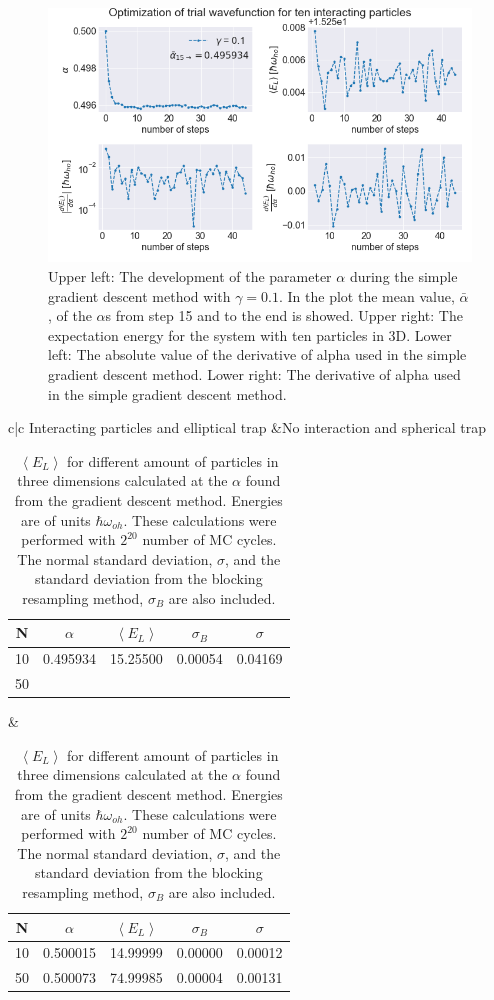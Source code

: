 \begin{figure}[H]
\center
\includegraphics[width=\linewidth]{../Results/gradient_descent_interaction_10p}\caption{Upper left: The development of the parameter $\alpha$ during the simple gradient descent method with $\gamma = 0.1$. In the plot the mean value, $\bar{\alpha}$, of the $\alpha$s from step 15 and to the end is showed. Upper right: The expectation energy for the system with ten particles in 3D. Lower left: The absolute value of the derivative of alpha used in the simple gradient descent method. Lower right: The derivative of alpha used in the simple gradient descent method. }\label{fig:interaction_gradient_descent_N_10}
\end{figure}


\begin{table}[H]\caption{$\left<E_L\right>$ for different amount of particles in three dimensions calculated at the $\alpha$ found from the gradient descent method. Energies are of units $\hbar\omega_{oh}$. These calculations were performed with $2^{20}$ number of MC cycles. The normal standard deviation, $\sigma$, and the standard deviation from the blocking resampling method, $\sigma_B$ are also included.}\label{tab:interaction_vs_not}
\center
\begin{tabular}{c|c}
Interacting particles and elliptical trap &No interaction and spherical trap\\
\begin{tabular}{ccccc}
N &$\alpha$ & $\left< E_L \right>$ & $\sigma_B$ & $\sigma$\\ \hline
10 &0.495934 & 15.25500 & 0.00054 & 0.04169\\
50 & \\
\end{tabular}&
\begin{tabular}{ccccc}
N &$\alpha$ & $\left< E_L \right>$ & $\sigma_B$ & $\sigma$\\ \hline
10 & 0.500015 & 14.99999 & 0.00000 & 0.00012\\
50 & 0.500073 & 74.99985 & 0.00004 & 0.00131\\
\end{tabular}
\end{tabular}
\end{table} 

